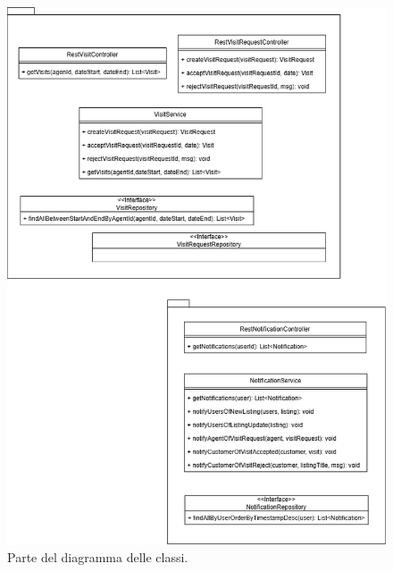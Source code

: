 \begin{figure}[h]
    \centering
    \includegraphics[width=\textwidth]{assets/diagrams/class-diagram/class-diagram-3.png}
    \caption{Parte del diagramma delle classi.}
    \label{fig:Parte 3 del diagramma delle classi}
\end{figure}

